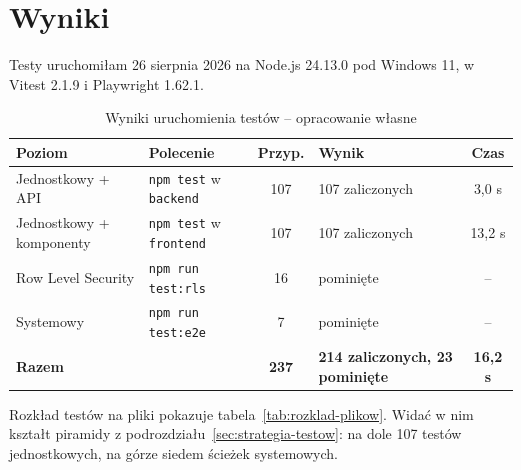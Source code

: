 \section{Wyniki}
\label{sec:wyniki-testow}

Testy uruchomiłam 26 sierpnia 2026 na Node.js 24.13.0 pod Windows 11, w Vitest 2.1.9 i Playwright 1.62.1.

\begin{table}[htbp]
\centering
\caption{Wyniki uruchomienia testów -- opracowanie własne}
\label{tab:wyniki-uruchomienia}
\begin{tabular}{|p{}|p{}|c|p{}|c|}
\hline
\textbf{Poziom} & \textbf{Polecenie} & \textbf{Przyp.} & \textbf{Wynik} & \textbf{Czas} \\
\hline
Jednostkowy + API & \texttt{npm test} w \texttt{backend} & 107 & 107 zaliczonych & 3,0 s \\
\hline
Jednostkowy + komponenty & \texttt{npm test} w \texttt{frontend} & 107 & 107 zaliczonych & 13,2 s \\
\hline
Row Level Security & \texttt{npm run test:rls} & 16 & pominięte & -- \\
\hline
Systemowy & \texttt{npm run test:e2e} & 7 & pominięte & -- \\
\hline
\textbf{Razem} & & \textbf{237} & \textbf{214 zaliczonych, 23 pominięte} & \textbf{16,2 s} \\
\hline
\end{tabular}
\end{table}

Rozkład testów na pliki pokazuje tabela~\ref{tab:rozklad-plikow}. Widać w nim kształt piramidy z podrozdziału~\ref{sec:strategia-testow}: na dole 107 testów jednostkowych, na górze siedem ścieżek systemowych.

